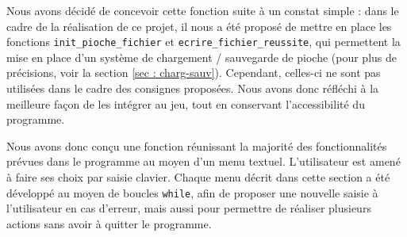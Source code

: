 \documentclass[titlepage]{article}
\begin{document}
Nous avons décidé de concevoir cette fonction suite à un constat simple : dans le cadre de la réalisation de ce projet, il nous a été proposé de mettre en place les fonctions \texttt{init\_pioche\_fichier} et \texttt{ecrire\_fichier\_reussite}, qui permettent la mise en place d'un système de chargement / sauvegarde de pioche (pour plus de précisions, voir la section \ref{sec : charg-sauv}). Cependant, celles-ci ne sont pas utilisées dans le cadre des consignes proposées. Nous avons donc réfléchi à la meilleure façon de les intégrer au jeu, tout en conservant l'accessibilité du programme.\par
Nous avons donc conçu une fonction réunissant la majorité des fonctionnalités prévues dans le programme au moyen d'un menu textuel. L'utilisateur est amené à faire ses choix par saisie clavier. Chaque menu décrit dans cette section a été développé au moyen de boucles \texttt{while}, afin de proposer une nouvelle saisie à l'utilisateur en cas d'erreur, mais aussi pour permettre de réaliser plusieurs actions sans avoir à quitter le programme.\par
\end{document}
